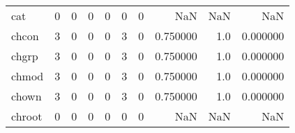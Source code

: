 \begin{longtable}{lrrrrrrrrr}
cat       &                                       0 &                                                  0 &                                                  0 &                                                  0 &                                                  0 &                                                  0 &                                                NaN &                                    NaN &                                  NaN \\
chcon     &                                       3 &                                                  0 &                                                  0 &                                                  0 &                                                  3 &                                                  0 &                                           0.750000 &                                    1.0 &                             0.000000 \\
chgrp     &                                       3 &                                                  0 &                                                  0 &                                                  0 &                                                  3 &                                                  0 &                                           0.750000 &                                    1.0 &                             0.000000 \\
chmod     &                                       3 &                                                  0 &                                                  0 &                                                  0 &                                                  3 &                                                  0 &                                           0.750000 &                                    1.0 &                             0.000000 \\
chown     &                                       3 &                                                  0 &                                                  0 &                                                  0 &                                                  3 &                                                  0 &                                           0.750000 &                                    1.0 &                             0.000000 \\
chroot    &                                       0 &                                                  0 &                                                  0 &                                                  0 &                                                  0 &                                                  0 &                                                NaN &                                    NaN &                                  NaN \\

\end{longtable}
